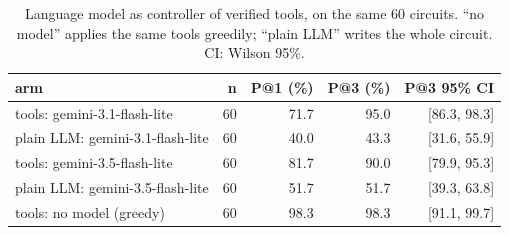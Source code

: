 \begin{table}[t]
\centering
\caption{Language model as controller of verified tools, on the same 60 circuits. ``no model'' applies the same tools greedily; ``plain LLM'' writes the whole circuit. CI: Wilson 95\%.}
\label{tab:tools}
\footnotesize
\setlength{\tabcolsep}{3pt}
\begin{tabular}{lrrrr}
\toprule
arm & n & P@1 (\%) & P@3 (\%) & P@3 95\% CI \\
\midrule
tools: gemini-3.1-flash-lite & 60 & 71.7 & 95.0 & [86.3, 98.3] \\
plain LLM: gemini-3.1-flash-lite & 60 & 40.0 & 43.3 & [31.6, 55.9] \\
tools: gemini-3.5-flash-lite & 60 & 81.7 & 90.0 & [79.9, 95.3] \\
plain LLM: gemini-3.5-flash-lite & 60 & 51.7 & 51.7 & [39.3, 63.8] \\
tools: no model (greedy) & 60 & 98.3 & 98.3 & [91.1, 99.7] \\
\bottomrule
\end{tabular}
\end{table}
